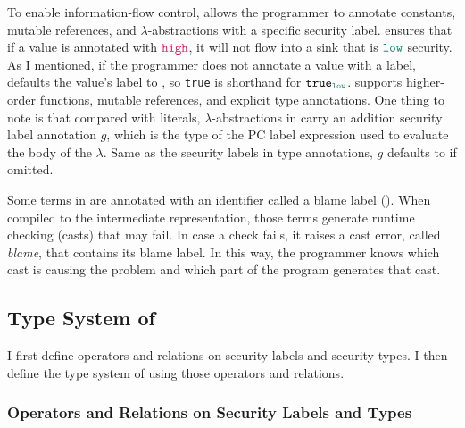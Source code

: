 To enable information-flow control, \Surface allows the programmer to annotate
constants, mutable references, and $\lambda$-abstractions with a specific
security label. \Surface ensures that if a value is annotated with $\high$, it
will not flow into a sink that is $\low$ security. As I mentioned, if the
programmer does not annotate a value with a label, \Surface defaults the value's
label to \low, so \texttt{true} is shorthand for $\mathtt{true}_{\low}$.
\Surface supports higher-order functions, mutable references, and explicit type
annotations. One thing to note is that compared with literals,
$\lambda$-abstractions in \Surface carry an addition security label annotation
$g$, which is the type of the PC label expression used to evaluate the body of
the $\lambda$. Same as the security labels in type annotations, $g$ defaults to
\unk if omitted.

Some terms in \Surface are annotated with an identifier called a blame label
(). When compiled to the intermediate representation, those terms generate
runtime checking (casts) that may fail. In case a check fails, it raises a cast
error, called \textit{blame}, that contains its blame label. In this way, the
programmer knows which cast is causing the problem and which part of the program
generates that cast.

\subsection{Type System of \Surface}
\label{sec:surface-typing}

I first define operators and relations on security labels and security types. I
then define the type system of \Surface using those operators and relations.

\subsubsection{Operators and Relations on Security Labels and Types}

